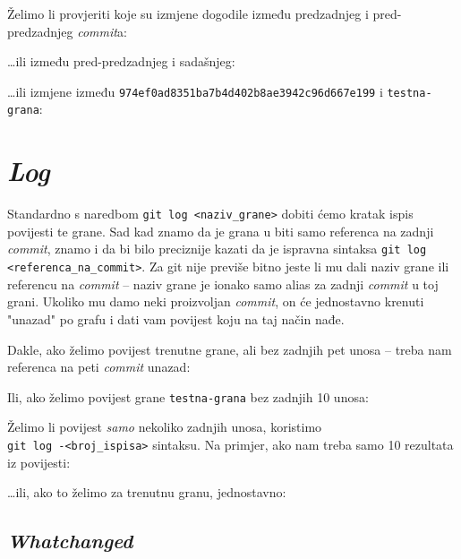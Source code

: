Želimo li provjeriti koje su izmjene dogodile između predzadnjeg i pred-predzadnjeg \emph{commit}a:


\dots{}ili između pred-predzadnjeg i sadašnjeg:


\dots{}ili izmjene između \verb+974ef0ad8351ba7b4d402b8ae3942c96d667e199+ i \verb+testna-grana+:


\section*{\emph{Log}}

Standardno s naredbom \verb+git log <naziv_grane>+ dobiti ćemo kratak ispis povijesti te grane.
Sad kad znamo da je grana u biti samo referenca na zadnji \emph{commit}, znamo i da bi bilo preciznije kazati da je ispravna sintaksa \verb+git log <referenca_na_commit>+.
Za git nije previše bitno jeste li mu dali naziv grane ili referencu na \emph{commit} -- naziv grane je ionako samo alias za zadnji \emph{commit} u toj grani.
Ukoliko mu damo neki proizvoljan \emph{commit}, on će jednostavno krenuti "unazad" po grafu i dati vam povijest koju na taj način nađe.

Dakle, ako želimo povijest trenutne grane, ali bez zadnjih pet unosa -- treba nam referenca na peti \emph{commit} unazad:


Ili, ako želimo povijest grane \verb+testna-grana+ bez zadnjih 10 unosa:


Želimo li povijest \emph{samo} nekoliko zadnjih unosa, koristimo \\\verb+git log -<broj_ispisa>+ sintaksu. 
Na primjer, ako nam treba samo 10 rezultata iz povijesti:


\dots{}ili, ako to želimo za trenutnu granu, jednostavno:


\subsection*{\emph{Whatchanged}}

